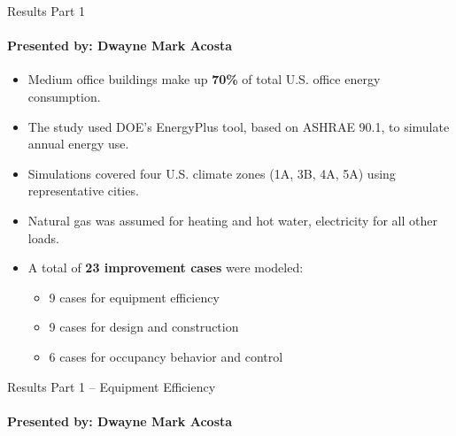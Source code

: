 \documentclass{beamer}
\begin{document}
\begin{frame}{Results Part 1}
\framesubtitle{Presented by: Dwayne Mark Acosta}

\begin{itemize}
    \item Medium office buildings make up \textbf{70\%} of total U.S. office energy consumption.
    \item The study used DOE's EnergyPlus tool, based on ASHRAE 90.1, to simulate annual energy use.
    \item Simulations covered four U.S. climate zones (1A, 3B, 4A, 5A) using representative cities.
    \item Natural gas was assumed for heating and hot water, electricity for all other loads.
    \item A total of \textbf{23 improvement cases} were modeled:
    \begin{itemize}
        \item 9 cases for equipment efficiency
        \item 9 cases for design and construction
        \item 6 cases for occupancy behavior and control
    \end{itemize}
\end{itemize}
\end{frame}

\begin{frame}{Results Part 1 – Equipment Efficiency}
    \framesubtitle{Presented by: Dwayne Mark Acosta}
    
    \scriptsize
    \begin{table}[h]
    \centering
    \caption{Equipment Efficiency Improvement Cases}
    \end{table}
    \end{frame}
\end{document}

